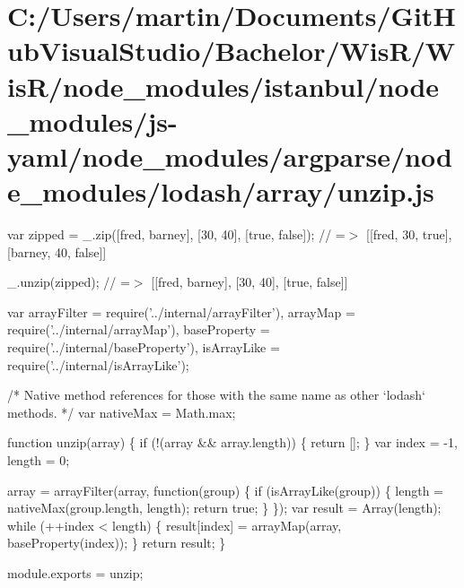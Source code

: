 \hypertarget{_c_1_2_users_2martin_2_documents_2_git_hub_visual_studio_2_bachelor_2_wis_r_2_wis_r_2node_module5e1e4a53e0917e59e06895f35bf4cbbf}{}\section{C\+:/\+Users/martin/\+Documents/\+Git\+Hub\+Visual\+Studio/\+Bachelor/\+Wis\+R/\+Wis\+R/node\+\_\+modules/istanbul/node\+\_\+modules/js-\/yaml/node\+\_\+modules/argparse/node\+\_\+modules/lodash/array/unzip.\+js}
var zipped = \+\_\+.\+zip(\mbox{[}\textquotesingle{}fred\textquotesingle{}, \textquotesingle{}barney\textquotesingle{}\mbox{]}, \mbox{[}30, 40\mbox{]}, \mbox{[}true, false\mbox{]}); // =$>$ \mbox{[}\mbox{[}\textquotesingle{}fred\textquotesingle{}, 30, true\mbox{]}, \mbox{[}\textquotesingle{}barney\textquotesingle{}, 40, false\mbox{]}\mbox{]}

\+\_\+.\+unzip(zipped); // =$>$ \mbox{[}\mbox{[}\textquotesingle{}fred\textquotesingle{}, \textquotesingle{}barney\textquotesingle{}\mbox{]}, \mbox{[}30, 40\mbox{]}, \mbox{[}true, false\mbox{]}\mbox{]}


\begin{DoxyCodeInclude}
var arrayFilter = require(\textcolor{stringliteral}{'../internal/arrayFilter'}),
    arrayMap = require(\textcolor{stringliteral}{'../internal/arrayMap'}),
    baseProperty = require(\textcolor{stringliteral}{'../internal/baseProperty'}),
    isArrayLike = require(\textcolor{stringliteral}{'../internal/isArrayLike'});

\textcolor{comment}{/* Native method references for those with the same name as other `lodash` methods. */}
var nativeMax = Math.max;

\textcolor{keyword}{function} unzip(array) \{
  \textcolor{keywordflow}{if} (!(array && array.length)) \{
    \textcolor{keywordflow}{return} [];
  \}
  var index = -1,
      length = 0;

  array = arrayFilter(array, \textcolor{keyword}{function}(group) \{
    \textcolor{keywordflow}{if} (isArrayLike(group)) \{
      length = nativeMax(group.length, length);
      \textcolor{keywordflow}{return} \textcolor{keyword}{true};
    \}
  \});
  var result = Array(length);
  \textcolor{keywordflow}{while} (++index < length) \{
    result[index] = arrayMap(array, baseProperty(index));
  \}
  \textcolor{keywordflow}{return} result;
\}

module.exports = unzip;
\end{DoxyCodeInclude}
 